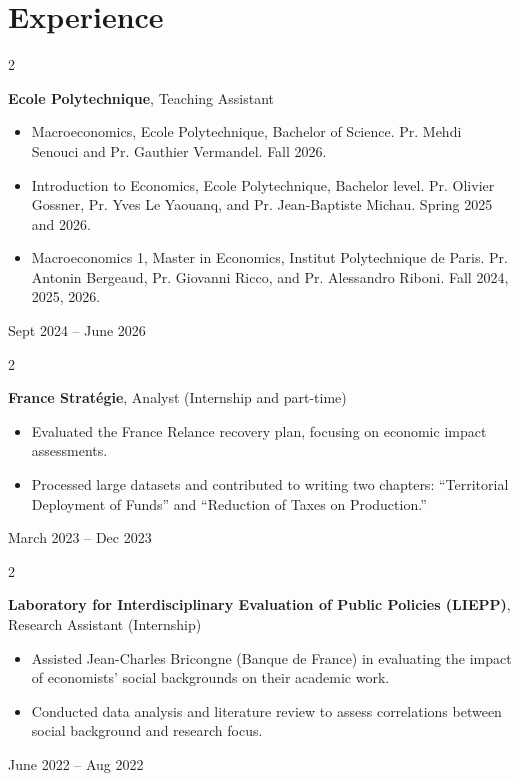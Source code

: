 \documentclass[10pt, letterpaper]{article}
\newenvironment{highlights}{
    \begin{itemize}[
        topsep=0.10 cm,
        parsep=0.10 cm,
        partopsep=0pt,
        itemsep=0pt,
        leftmargin=0.4 cm + 10pt
    ]
}{
    \end{itemize}
} %
\newenvironment{twocolentry}[2][]{
    \onecolentry
    \def\secondColumn{#2}
    \setcolumnwidth{\fill, 4.5 cm}
    \begin{paracol}{2}
}{
    \switchcolumn \raggedleft \secondColumn
    \end{paracol}
    \endonecolentry
} %
\begin{document}
    
    \section{Experience}
\begin{twocolentry}{
    Sept 2024 – June 2026
}
    \textbf{Ecole Polytechnique}, Teaching Assistant
    \begin{highlights}
        \item Macroeconomics, Ecole Polytechnique, Bachelor of Science. Pr. Mehdi Senouci and Pr. Gauthier Vermandel. Fall 2026.
        \item  Introduction to Economics, Ecole Polytechnique, Bachelor level. Pr. Olivier Gossner, Pr. Yves Le Yaouanq, and Pr. Jean-Baptiste Michau. Spring 2025 and 2026.
        \item Macroeconomics 1, Master in Economics, Institut Polytechnique de Paris. Pr. Antonin Bergeaud,  Pr. Giovanni Ricco, and Pr. Alessandro Riboni. Fall 2024, 2025, 2026.
    \end{highlights}
\end{twocolentry}

\vspace{0.2 cm} 

\begin{twocolentry}{
    March 2023 – Dec 2023
}
    \textbf{France Stratégie}, Analyst (Internship and part-time)
    \begin{highlights}
        \item Evaluated the France Relance recovery plan, focusing on economic impact assessments.
        \item Processed large datasets and contributed to writing two chapters: “Territorial Deployment of Funds” and “Reduction of Taxes on Production.”
    \end{highlights}
\end{twocolentry}

\vspace{0.2 cm}

\begin{twocolentry}{
    June 2022 – Aug 2022
}
    \textbf{Laboratory for Interdisciplinary Evaluation of Public Policies (LIEPP)}, Research Assistant (Internship)
    \begin{highlights}
        \item Assisted Jean-Charles Bricongne (Banque de France) in evaluating the impact of economists' social backgrounds on their academic work.
        \item Conducted data analysis and literature review to assess correlations between social background and research focus.
    \end{highlights}
\end{twocolentry}
\end{document}
